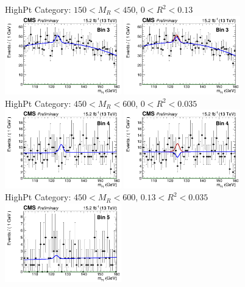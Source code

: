 \begin{figure}[ht!]
\centering
HighPt Category: $150 < M_{R} < 450$\GeV, $0 < R^{2} < 0.13$\\
\includegraphics[width=0.45\textwidth, angle=0.]{figs/unblindedResults2p3Plus12p9/bin3_fit_b.png}
\includegraphics[width=0.45\textwidth, angle=0.]{figs/unblindedResults2p3Plus12p9/bin3_fit_s.png}\\
HighPt Category: $450 < M_{R} < 600$\GeV, $0 < R^{2} < 0.035$\\
\includegraphics[width=0.45\textwidth, angle=0.]{figs/unblindedResults2p3Plus12p9/bin4_fit_b.png}
\includegraphics[width=0.45\textwidth, angle=0.]{figs/unblindedResults2p3Plus12p9/bin4_fit_s.png}\\
HighPt Category: $450 < M_{R} < 600$\GeV, $0.13 < R^{2} < 0.035$\\
\includegraphics[width=0.45\textwidth, angle=0.]{figs/unblindedResults2p3Plus12p9/bin5_fit_b.png}

\end{figure}
